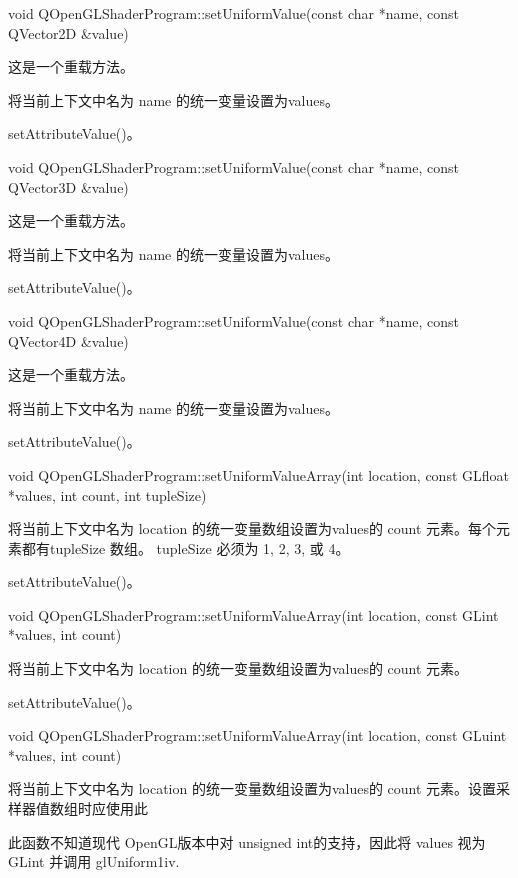void QOpenGLShaderProgram::setUniformValue(const char *name, const QVector2D \&value)

这是一个重载方法。

将当前上下文中名为 name 的统一变量设置为values。


\begin{seeAlso}
setAttributeValue()。
\end{seeAlso}

void QOpenGLShaderProgram::setUniformValue(const char *name, const QVector3D \&value)

这是一个重载方法。

将当前上下文中名为 name 的统一变量设置为values。

\begin{seeAlso}
setAttributeValue()。
\end{seeAlso}

void QOpenGLShaderProgram::setUniformValue(const char *name, const QVector4D \&value)

这是一个重载方法。

将当前上下文中名为 name 的统一变量设置为values。

\begin{seeAlso}
setAttributeValue()。
\end{seeAlso}

void QOpenGLShaderProgram::setUniformValueArray(int location, const GLfloat *values, int count, int tupleSize)

将当前上下文中名为 location 的统一变量数组设置为values的 count 元素。每个元素都有tupleSize 数组。 tupleSize 必须为 1, 2, 3, 或 4。

\begin{seeAlso}
setAttributeValue()。
\end{seeAlso}

void QOpenGLShaderProgram::setUniformValueArray(int location, const GLint *values, int count)

将当前上下文中名为 location 的统一变量数组设置为values的 count 元素。

\begin{seeAlso}
setAttributeValue()。
\end{seeAlso}

void QOpenGLShaderProgram::setUniformValueArray(int location, const GLuint *values, int count)

将当前上下文中名为 location 的统一变量数组设置为values的 count 元素。设置采样器值数组时应使用此

\begin{notice}
此函数不知道现代 OpenGL版本中对 unsigned int的支持，因此将 values 视为 GLint 并调用 glUniform1iv.
\end{notice}

